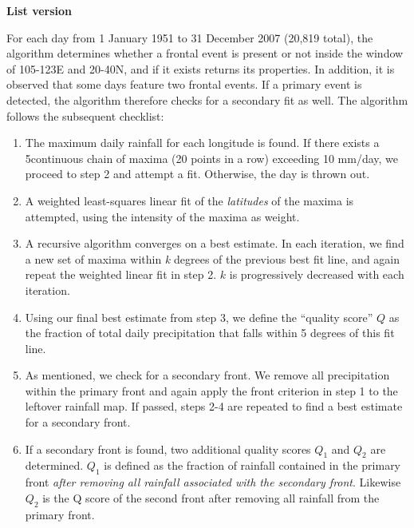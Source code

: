 \documentclass[draft,grl]{AGUTeX}
\begin{document}
\begin{article}

\textbf{List version}

For each day from 1 January 1951 to 31 December 2007 (20,819 total), the algorithm determines whether a frontal event is present or not inside the window of 105-123E and 20-40N, and if it exists returns its properties. In addition, it is observed that some days feature two frontal events. If a primary event is detected, the algorithm therefore checks for a secondary fit as well. The algorithm follows the subsequent checklist:

\begin{enumerate}
	\item The maximum daily rainfall for each longitude is found. If there exists a 5\textdegree continuous chain of maxima (20 points in a row) exceeding 10 mm/day, we proceed to step 2 and attempt a fit. Otherwise, the day is thrown out.
	
	\item A weighted least-squares linear fit of the \textit{latitudes} of the maxima is attempted, using the intensity of the maxima as weight.
	
	\item A recursive algorithm converges on a best estimate. In each iteration, we find a new set of maxima within \textit{k} degrees of the previous best fit line, and again repeat the weighted linear fit in step 2. $k$ is progressively decreased with each iteration.
	
	\item Using our final best estimate from step 3, we define the ``quality score'' $Q$ as the fraction of total daily precipitation that falls within 5 degrees of this fit line.
	
	\item As mentioned, we check for a secondary front. We remove all precipitation within the primary front and again apply the front criterion in step 1 to the leftover rainfall map. If passed, steps 2-4 are repeated to find a best estimate for a secondary front.
	
	\item If a secondary front is found, two additional quality scores $Q_1$ and $Q_2$ are determined. $Q_1$ is defined as the fraction of rainfall contained in the primary front \textit{after removing all rainfall associated with the secondary front}. Likewise $Q_2$ is the Q score of the second front after removing all rainfall from the primary front.
			

\end{enumerate}
\end{article}
\end{document}
